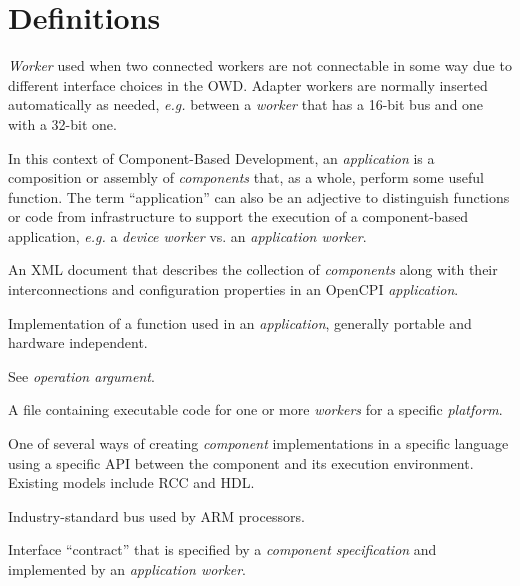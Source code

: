 \section{Definitions}
\begin{description}[style=nextline]
\item[Adapter Worker]
\textit{Worker} used when two connected workers are not connectable in some way due to different interface choices in the OWD.  Adapter workers are normally inserted automatically as needed, \textit{e.g.} between a \textit{worker} that has a 16-bit bus and one with a 32-bit one.

\item[Application]
In this context of Component-Based Development, an \textit{application} is a composition or assembly of \textit{components} that, as a whole, perform some useful function. The term ``application'' can also be an adjective to distinguish functions or code from infrastructure to support the execution of a component-based application, \textit{e.g.} a \textit{device worker} vs. an \textit{application worker}.

\item[Application Specification (OAS)]
An XML document that describes the collection of \textit{components} along with their interconnections and configuration properties in an OpenCPI \textit{application}.

\item[Application Worker]
Implementation of a function used in an \textit{application}, generally portable and hardware independent.

\item[Argument]
See \textit{operation argument}.

\item[Artifact]
A file containing executable code for one or more \textit{workers}  for a specific \textit{platform}.

\item[Authoring Model]
One of several ways of creating \textit{component} implementations in a specific language using a specific API between the component and its execution environment.  Existing models include RCC and HDL. %

\item[AXI (Advanced eXtensible Interface)]
Industry-standard bus used by ARM processors.

\item[Component]
Interface ``contract'' that is specified by a \textit{component specification} and implemented by an \textit{application worker}.


\end{description}
